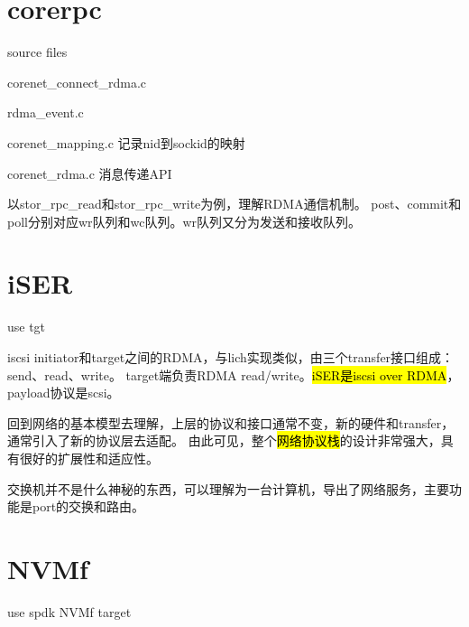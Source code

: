 \section{corerpc}

source files
\begin{enumbox}
\item corenet\_connect\_rdma.c
\item rdma\_event.c
\item corenet\_mapping.c 记录nid到sockid的映射
\item corenet\_rdma.c 消息传递API
\end{enumbox}

以stor\_rpc\_read和stor\_rpc\_write为例，理解RDMA通信机制。
post、commit和poll分别对应wr队列和wc队列。wr队列又分为发送和接收队列。

\section{iSER}

use tgt

iscsi initiator和target之间的RDMA，与lich实现类似，由三个transfer接口组成：send、read、write。
target端负责RDMA read/write。\hl{iSER是iscsi over RDMA}，payload协议是scsi。

回到网络的基本模型去理解，上层的协议和接口通常不变，新的硬件和transfer，通常引入了新的协议层去适配。
由此可见，整个\hl{网络协议栈}的设计非常强大，具有很好的扩展性和适应性。

交换机并不是什么神秘的东西，可以理解为一台计算机，导出了网络服务，主要功能是port的交换和路由。

\section{NVMf}

use spdk NVMf target
